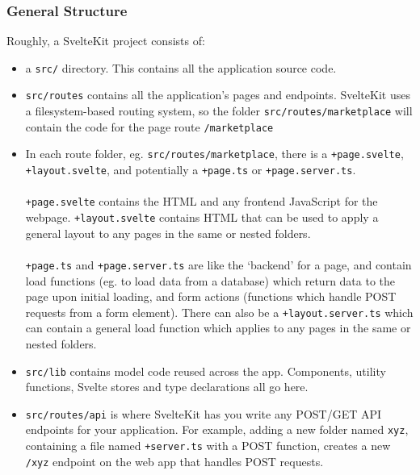 \documentclass[12pt,a4paper]{article}
\begin{document}
\subsubsection{General Structure}
Roughly, a SvelteKit project consists of:
\begin{itemize}
    \item a \verb|src/| directory. This contains all the application source code.
    \item \verb|src/routes| contains all the application's pages and endpoints. SvelteKit uses a filesystem-based routing system, so the folder \verb|src/routes/marketplace| will contain the code for the page route \verb|/marketplace|
    \item In each route folder, eg. \verb|src/routes/marketplace|, there is a \verb|+page.svelte|, \verb|+layout.svelte|, and potentially a \verb|+page.ts| or \verb|+page.server.ts|.\\\\ \verb|+page.svelte| contains the HTML and any frontend JavaScript for the webpage. \verb|+layout.svelte| contains HTML that can be used to apply a general layout to any pages in the same or nested folders. \\\\\verb|+page.ts| and \verb|+page.server.ts| are like the `backend' for a page, and contain load functions (eg. to load data from a database) which return data to the page upon initial loading, and form actions (functions which handle POST requests from a form element). There can also be a \verb|+layout.server.ts| which can contain a general load function which applies to any pages in the same or nested folders.
    \item \verb|src/lib| contains model code reused across the app. Components, utility functions, Svelte stores and type declarations all go here.
    \item \verb|src/routes/api| is where SvelteKit has you write any POST/GET API endpoints for your application. For example, adding a new folder named \verb|xyz|, containing a file named \verb|+server.ts| with a POST function, creates a new \verb|/xyz| endpoint on the web app that handles POST requests.
\end{itemize}
\end{document}
